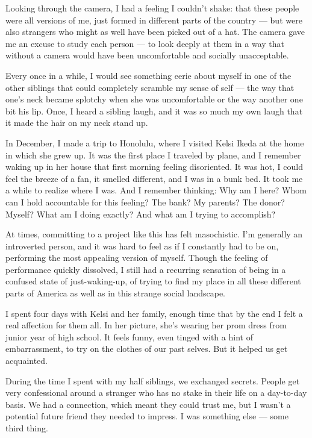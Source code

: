 Looking through the camera, I had a feeling I couldn't shake: that these
people were all versions of me, just formed in different parts of the
country --- but were also strangers who might as well have been picked
out of a hat. The camera gave me an excuse to study each person --- to
look deeply at them in a way that without a camera would have been
uncomfortable and socially unacceptable.

Every once in a while, I would see something eerie about myself in one
of the other siblings that could completely scramble my sense of self
--- the way that one's neck became splotchy when she was uncomfortable
or the way another one bit his lip. Once, I heard a sibling laugh, and
it was so much my own laugh that it made the hair on my neck stand up.

In December, I made a trip to Honolulu, where I visited Kelsi Ikeda at
the home in which she grew up. It was the first place I traveled by
plane, and I remember waking up in her house that first morning feeling
disoriented. It was hot, I could feel the breeze of a fan, it smelled
different, and I was in a bunk bed. It took me a while to realize where
I was. And I remember thinking: Why am I here? Whom can I hold
accountable for this feeling? The bank? My parents? The donor? Myself?
What am I doing exactly? And what am I trying to accomplish?

At times, committing to a project like this has felt masochistic. I'm
generally an introverted person, and it was hard to feel as if I
constantly had to be on, performing the most appealing version of
myself. Though the feeling of performance quickly dissolved, I still had
a recurring sensation of being in a confused state of just-waking-up, of
trying to find my place in all these different parts of America as well
as in this strange social landscape.

I spent four days with Kelsi and her family, enough time that by the end
I felt a real affection for them all. In her picture, she's wearing her
prom dress from junior year of high school. It feels funny, even tinged
with a hint of embarrassment, to try on the clothes of our past selves.
But it helped us get acquainted.

During the time I spent with my half siblings, we exchanged secrets.
People get very confessional around a stranger who has no stake in their
life on a day-to-day basis. We had a connection, which meant they could
trust me, but I wasn't a potential future friend they needed to impress.
I was something else --- some third thing.

